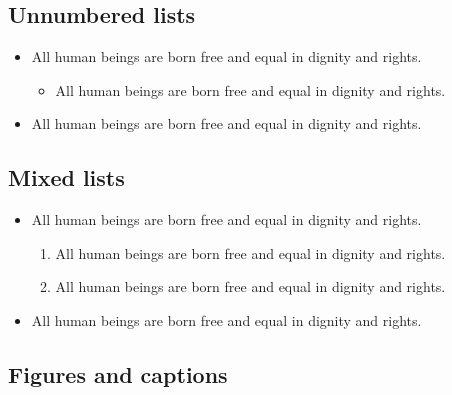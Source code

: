 \documentclass[
]{beamer}
\providecommand{\tightlist}{%
  \setlength{\itemsep}{0pt}\setlength{\parskip}{0pt}}
\begin{document}
\hypertarget{unnumbered-lists}{%
\subsection{Unnumbered lists}\label{unnumbered-lists}}

\begin{itemize}
\tightlist
\item
  All human beings are born free and equal in dignity and rights.

  \begin{itemize}
  \tightlist
  \item
    All human beings are born free and equal in dignity and rights.
  \end{itemize}
\item
  All human beings are born free and equal in dignity and rights.
\end{itemize}

\hypertarget{mixed-lists}{%
\subsection{Mixed lists}\label{mixed-lists}}

\begin{itemize}
\tightlist
\item
  All human beings are born free and equal in dignity and rights.

  \begin{enumerate}
  \def\labelenumi{\arabic{enumi}.}
  \tightlist
  \item
    All human beings are born free and equal in dignity and rights.
  \item
    All human beings are born free and equal in dignity and rights.
  \end{enumerate}
\item
  All human beings are born free and equal in dignity and rights.
\end{itemize}

\hypertarget{figures-and-captions}{%
\subsection{Figures and captions}\label{figures-and-captions}}
\end{document}
